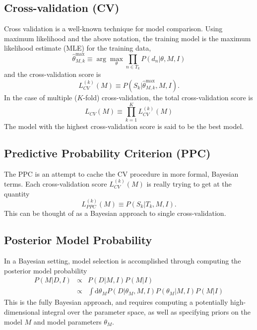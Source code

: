 \documentclass[12pt]{article}
\newcommand{\highlight}[1]{{\color{green} #1}}
\newcommand{\dd}{\mathrm{d}}
\begin{document}
\subsection{Cross-validation (CV)}
Cross validation is a well-known technique for model comparison.  Using
maximum likelihood and the above notation, the training model is the
maximum likelihood estimate (MLE) for the training data,
\begin{equation}
  \hat{\theta}^{\max}_{M,k} \equiv \arg\max_\theta \prod_{n \in T_k} P(d_n|\theta, M, I)
\end{equation}
and the cross-validation score is
\begin{equation}
  L^{(k)}_{CV}(M) \equiv P(S_k | \hat{\theta}^{\max}_{M,k}, M, I).
\end{equation}
In the case of multiple ($K$-fold) cross-validation, the total
cross-validation score is
\begin{equation}
  L_{CV}(M) \equiv \prod_{k=1}^K L^{(k)}_{CV}(M)
\end{equation}
The model with the highest cross-validation score is said to be the
best model.

\subsection{\highlight{Predictive Probability Criterion (PPC)}}
The PPC is an attempt to cache the CV procedure in more formal, Bayesian
terms.  Each cross-validation score $L^{(k)}_{CV}(M)$ is really trying to
get at the quantity
\begin{equation}
  L^{(k)}_{PPC}(M) \equiv P(S_k|T_k, M, I).
\end{equation}
This can be thought of as a Bayesian approach to single cross-validation.

\subsection{Posterior Model Probability}
In a Bayesian setting, model selection is accomplished through computing
the posterior model probability
\begin{eqnarray}
  P(M|D,I) &\propto& P(D|M,I)P(M|I)\\
           &\propto& \int \dd\theta_M P(D|\theta_M,M,I)P(\theta_M|M,I) P(M|I)
\end{eqnarray}
This is the fully Bayesian approach, and requires computing a potentially
high-dimensional integral over the parameter space, as well as specifying
priors on the model $M$ and model parameters $\theta_M$.
\end{document}
